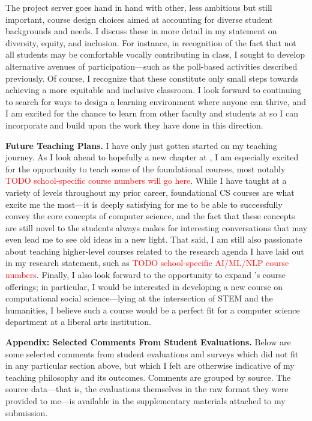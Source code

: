 \documentclass[11pt,letterpaper]{article}
\renewcommand{\section}[1]{\vspace{0.25\baselineskip}\noindent\textbf{#1.}}
\begin{document}
The project server goes hand in hand with other, less ambitious but still important, course design choices aimed at accounting for diverse student backgrounds and needs.
\iflongdei
I discuss these in more detail in my statement on diversity, equity, and inclusion.
\else
For instance, in recognition of the fact that not all students may be comfortable vocally contributing in class, I sought to develop alternative avenues of participation---such as the poll-based activities described previously.
\fi
Of course, I recognize that these constitute only small steps towards achieving a more equitable and inclusive classroom.
I look forward to continuing to search for ways to design a learning environment where anyone can thrive, and I am excited for the chance to learn from other faculty and students at \schoolname so I can incorporate and build upon the work they have done in this direction.

\section{Future Teaching Plans}
I have only just gotten started on my teaching journey.
As I look ahead to hopefully a new chapter at \schoolname, I am especially excited for the opportunity to teach some of the foundational courses, most notably \textcolor{red}{TODO school-specific course numbers will go here}.
While I have taught at a variety of levels throughout my prior career, foundational CS courses are what excite me the most---it is deeply satisfying for me to be able to successfully convey the core concepts of computer science, and the fact that these concepts are still novel to the students always makes for interesting conversations that may even lead me to see old ideas in a new light.
That said, I am still also passionate about teaching higher-level courses related to the research agenda I have laid out in my research statement, such as \textcolor{red}{TODO school-specific AI/ML/NLP course numbers}.
Finally, I also look forward to the opportunity to expand \schoolname's course offerings; in particular, I would be interested in developing a new course on computational social science---lying at the intersection of STEM and the humanities, I believe such a course would be a perfect fit for a computer science department at a liberal arts institution.

\ifappendix
\vspace{\baselineskip}
\section{Appendix: Selected Comments From Student Evaluations}
Below are some selected comments from student evaluations and surveys which did not fit in any particular section above, but which I felt are otherwise indicative of my teaching philosophy and its outcomes.
Comments are grouped by source.
The source data---that is, the evaluations themselves in the raw format they were provided to me---is available in the supplementary materials attached to my submission.
\end{document}
